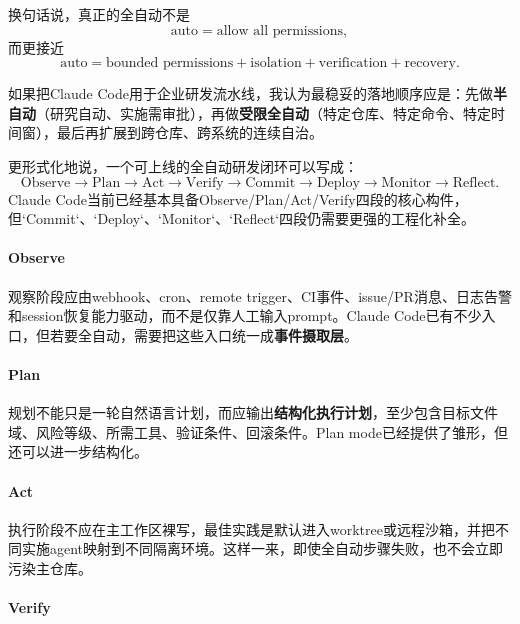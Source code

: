 \documentclass[12pt,a4paper]{article}
\begin{document}
换句话说，真正的全自动不是
\[
\text{auto} = \text{allow all permissions},
\]
而更接近
\begin{equation}
\text{auto} = \text{bounded permissions} + \text{isolation} + \text{verification} + \text{recovery}.
\end{equation}

如果把Claude Code用于企业研发流水线，我认为最稳妥的落地顺序应是：先做\textbf{半自动}（研究自动、实施需审批），再做\textbf{受限全自动}（特定仓库、特定命令、特定时间窗），最后再扩展到跨仓库、跨系统的连续自治。

更形式化地说，一个可上线的全自动研发闭环可以写成：
\begin{equation}
\text{Observe} \rightarrow \text{Plan} \rightarrow \text{Act} \rightarrow \text{Verify} \rightarrow \text{Commit} \rightarrow \text{Deploy} \rightarrow \text{Monitor} \rightarrow \text{Reflect}.
\end{equation}
Claude Code当前已经基本具备Observe/Plan/Act/Verify四段的核心构件，但`Commit`、`Deploy`、`Monitor`、`Reflect`四段仍需要更强的工程化补全。

\paragraph{Observe}

观察阶段应由webhook、cron、remote trigger、CI事件、issue/PR消息、日志告警和session恢复能力驱动，而不是仅靠人工输入prompt。Claude Code已有不少入口，但若要全自动，需要把这些入口统一成\textbf{事件摄取层}。

\paragraph{Plan}

规划不能只是一轮自然语言计划，而应输出\textbf{结构化执行计划}，至少包含目标文件域、风险等级、所需工具、验证条件、回滚条件。Plan mode已经提供了雏形，但还可以进一步结构化。

\paragraph{Act}

执行阶段不应在主工作区裸写，最佳实践是默认进入worktree或远程沙箱，并把不同实施agent映射到不同隔离环境。这样一来，即使全自动步骤失败，也不会立即污染主仓库。

\paragraph{Verify}
\end{document}
